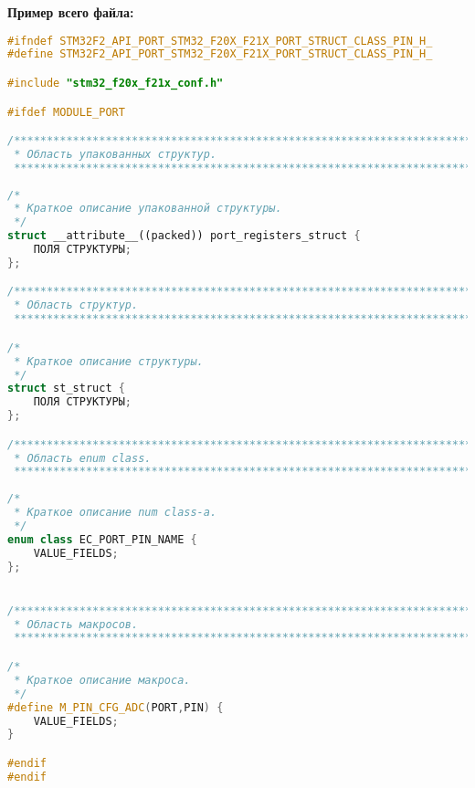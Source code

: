 \textbf{Пример всего файла:}\begin{lstlisting}[language=C++, frame=tlBR, basicstyle=\fontsize{10}{10}\ttfamily]
#ifndef STM32F2_API_PORT_STM32_F20X_F21X_PORT_STRUCT_CLASS_PIN_H_
#define STM32F2_API_PORT_STM32_F20X_F21X_PORT_STRUCT_CLASS_PIN_H_

#include "stm32_f20x_f21x_conf.h"

#ifdef MODULE_PORT

/**********************************************************************
 * Область упакованных структур.
 **********************************************************************/
 
/*
 * Краткое описание упакованной структуры.
 */
struct __attribute__((packed)) port_registers_struct {
	ПОЛЯ СТРУКТУРЫ;
};

/**********************************************************************
 * Область структур.
 **********************************************************************/

/*
 * Краткое описание структуры.
 */
struct st_struct {
	ПОЛЯ СТРУКТУРЫ;
};

/**********************************************************************
 * Область enum class.
 **********************************************************************/
 
/*
 * Краткое описание num class-а.
 */
enum class EC_PORT_PIN_NAME {
	VALUE_FIELDS;
};


/**********************************************************************
 * Область макросов.
 **********************************************************************/

/*
 * Краткое описание макроса.
 */
#define M_PIN_CFG_ADC(PORT,PIN)	{
	VALUE_FIELDS;
}

#endif
#endif
 \end{lstlisting}